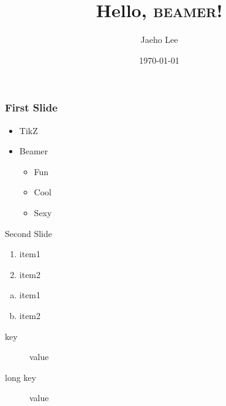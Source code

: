 \documentclass{beamer}
\title{Hello, \textsc{beamer}!}
\author{Jaeho Lee}
\date{\today}
\begin{document}
\maketitle
\begin{frame}
  \frametitle{First Slide}
  \begin{itemize}
    \item TikZ
    \item Beamer
      \begin{itemize}
        \item Fun
        \item Cool
        \item Sexy
      \end{itemize}
  \end{itemize}
\end{frame}
\begin{frame}{Second Slide}
  \begin{enumerate}
    \item item1
    \item item2
  \end{enumerate}
  \begin{enumerate}[(a)]
    \item item1
    \item item2
  \end{enumerate}
  \begin{description}
    \item[key] value
    \item[long key] value
  \end{description}
\end{frame}
\end{document}
